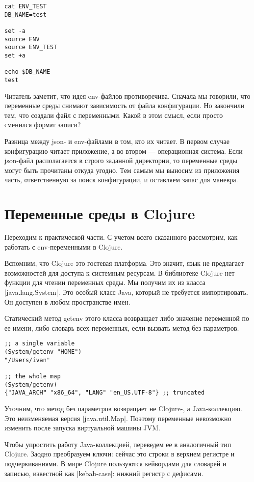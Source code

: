 \begin{verbatim}
cat ENV_TEST
DB_NAME=test

set -a
source ENV
source ENV_TEST
set +a

echo $DB_NAME
test
\end{verbatim}

Читатель заметит, что идея env-файлов противоречива. Сначала мы говорили, что
переменные среды снимают зависимость от файла конфигурации. Но закончили тем,
что создали файл с переменными. Какой в этом смысл, если просто сменился формат
записи?

Разница между json- и env-файлами в том, кто их читает. В первом случае
конфигурацию читает приложение, а во втором — операционная система. Если
json-файл располагается в строго заданной директории, то переменные среды могут
быть прочитаны откуда угодно. Тем самым мы выносим из приложения часть,
ответственную за поиск конфигурации, и оставляем запас для маневра.

\section{Переменные среды в Clojure}

Переходим к практической части. С учетом всего сказанного рассмотрим, как
работать с env-переменными в Clojure.

Вспомним, что Clojure это гостевая платформа. Это значит, язык не предлагает
возможностей для доступа к системным ресурсам. В библиотеке Clojure нет функции
для чтении переменных среды. Мы получим их из класса \spverb|java.lang.System|. Это
особый класс Java, который не требуется импортировать. Он доступен в любом
пространстве имен.

Статический метод getenv этого класса возвращает либо значение переменной по ее
имени, либо словарь всех переменных, если вызвать метод без параметров.

\begin{verbatim}
;; a single variable
(System/getenv "HOME")
"/Users/ivan"

;; the whole map
(System/getenv)
{"JAVA_ARCH" "x86_64", "LANG" "en_US.UTF-8"} ;; truncated
\end{verbatim}

Уточним, что метод без параметров возвращает не Clojure-, а Java-коллекцию. Это
неизменяемая версия \spverb|java.util.Map|. Поэтому переменные невозможно изменить
после запуска виртуальной машины JVM.

Чтобы упростить работу Java-коллекцией, переведем ее в аналогичный тип
Clojure. Заодно преобразуем ключи: сейчас это строки в верхнем регистре и
подчеркиваниями. В мире Clojure пользуются кейвордами для словарей и записью,
известной как \spverb|kebab-case|: нижний регистр с дефисами.

